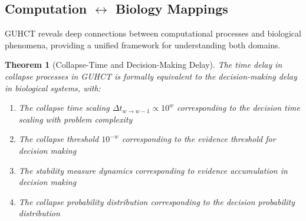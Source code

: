 \documentclass[11pt,a4paper]{article}
\newtheorem{theorem}{Theorem}[section]
\begin{document}
\subsection{Computation \texorpdfstring{$\leftrightarrow$}{↔} Biology Mappings}
\label{subsec:computation_biology}


GUHCT reveals deep connections between computational processes and biological phenomena, providing a unified framework for understanding both domains.

\begin{theorem}[Collapse-Time and Decision-Making Delay]
\label{thm:collapse_decision}
The time delay in collapse processes in GUHCT is formally equivalent to the decision-making delay in biological systems, with:
\begin{enumerate}
    \item The collapse time scaling $\Delta t_{w \to w-1} \propto 10^w$ corresponding to the decision time scaling with problem complexity
    \item The collapse threshold $10^{-w}$ corresponding to the evidence threshold for decision making
    \item The stability measure dynamics corresponding to evidence accumulation in decision making
    \item The collapse probability distribution corresponding to the decision probability distribution
\end{enumerate}
\end{theorem}
\end{document}
